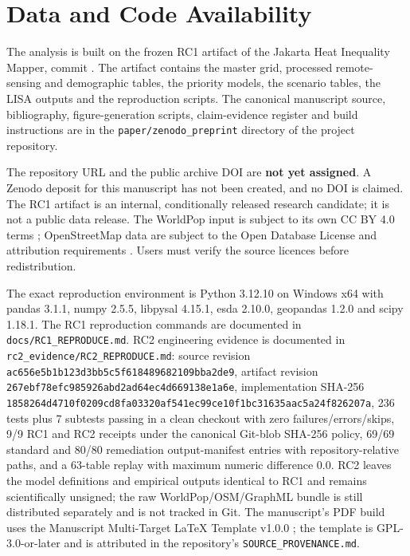 \documentclass[times,twoside]{_Templates/MultiTargetManuscript}
\begin{document}
\section*{Data and Code Availability}

The analysis is built on the frozen RC1 artifact of the Jakarta Heat Inequality
Mapper, commit \texttt{}. The artifact
contains the master grid, processed remote-sensing and demographic tables, the
priority models, the scenario tables, the LISA outputs and the reproduction
scripts. The canonical manuscript source, bibliography, figure-generation
scripts, claim-evidence register and build instructions are in the
\texttt{paper/zenodo\_preprint} directory of the project repository.

The repository URL and the public archive DOI are \textbf{not yet assigned}.
A Zenodo deposit for this manuscript has not been created, and no DOI is
claimed. The RC1 artifact is an internal, conditionally released research
candidate; it is not a public data release. The WorldPop input is subject to its
own CC BY 4.0 terms \citep{worldpop2025}; OpenStreetMap data are subject to the
Open Database License and attribution requirements \citep{osm2026}. Users must
verify the source licences before redistribution.

The exact reproduction environment is Python 3.12.10 on Windows x64 with pandas
3.1.1, numpy 2.5.5, libpysal 4.15.1, esda 2.10.0, geopandas 1.2.0 and scipy
1.18.1. The RC1 reproduction commands are documented in
\texttt{docs/RC1\_REPRODUCE.md}. RC2 engineering evidence is documented in
\texttt{rc2\_evidence/RC2\_REPRODUCE.md}: source revision
\texttt{ac656e5b1b123d3bb5c5f618489682109bba2de9}, artifact revision
\texttt{267ebf78efc985926abd2ad64ec4d669138e1a6e}, implementation SHA-256
\texttt{1858264d4710f0209cd8fa03320af541ec99ce10f1bc31635aac5a24f826207a},
236 tests plus 7 subtests passing in a clean checkout with zero
failures/errors/skips, 9/9 RC1 and RC2 receipts under the canonical Git-blob
SHA-256 policy, 69/69 standard and 80/80 remediation output-manifest entries
with repository-relative paths, and a 63-table replay with maximum numeric
difference 0.0. RC2 leaves the model definitions and empirical outputs identical
to RC1 and remains scientifically unsigned; the raw WorldPop/OSM/GraphML bundle
is still distributed separately and is not tracked in Git. The
manuscript's PDF build uses the Manuscript Multi-Target LaTeX Template v1.0.0
\citep{aramayo2026}; the template is GPL-3.0-or-later and is attributed in the
repository's \texttt{SOURCE\_PROVENANCE.md}.
\end{document}
